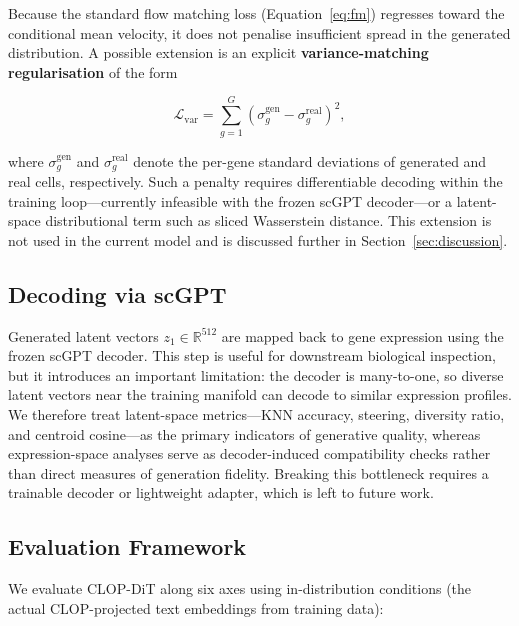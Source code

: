 \documentclass[genes,article,submit,pdftex,oneauthor]{Definitions/mdpi}
\begin{document}
Because the standard flow matching loss (Equation~\ref{eq:fm}) regresses toward the conditional mean velocity, it does not penalise insufficient spread in the generated distribution. A possible extension is an explicit \textbf{variance-matching regularisation} of the form
\begin{linenomath}
\begin{equation}
  \mathcal{L}_\text{var} = \sum_{g=1}^{G} \left( \sigma_g^{\text{gen}} - \sigma_g^{\text{real}} \right)^2,
  \label{eq:var-loss}
\end{equation}
\end{linenomath}
where $\sigma_g^{\text{gen}}$ and $\sigma_g^{\text{real}}$ denote the per-gene standard deviations of generated and real cells, respectively. Such a penalty requires differentiable decoding within the training loop---currently infeasible with the frozen scGPT decoder---or a latent-space distributional term such as sliced Wasserstein distance. This extension is not used in the current model and is discussed further in Section~\ref{sec:discussion}.

\subsection{Decoding via scGPT}\label{sec:decoding}

Generated latent vectors $z_1 \in \mathbb{R}^{512}$ are mapped back to gene expression using the frozen scGPT decoder. This step is useful for downstream biological inspection, but it introduces an important limitation: the decoder is many-to-one, so diverse latent vectors near the training manifold can decode to similar expression profiles. We therefore treat latent-space metrics---KNN accuracy, steering, diversity ratio, and centroid cosine---as the primary indicators of generative quality, whereas expression-space analyses serve as decoder-induced compatibility checks rather than direct measures of generation fidelity. Breaking this bottleneck requires a trainable decoder or lightweight adapter, which is left to future work.

\subsection{Evaluation Framework}\label{sec:evaluation}

We evaluate CLOP-DiT along six axes using in-distribution conditions (the actual CLOP-projected text embeddings from training data):
\end{document}
